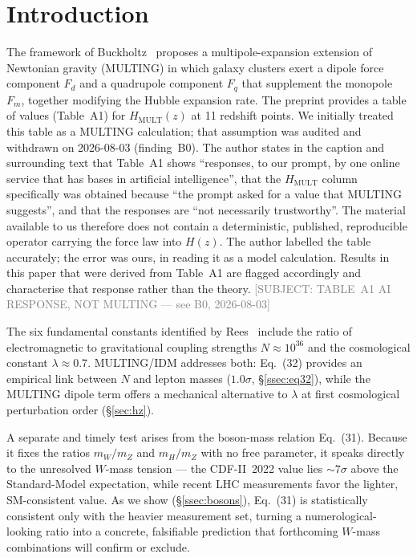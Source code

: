 \documentclass[twocolumn,prd,amsmath,amssymb,floatfix]{revtex4-2}
\newcommand{\tableAsubject}{\textcolor{gray}{\small[SUBJECT:
  TABLE~A1 AI RESPONSE, NOT MULTING --- see B0, 2026-08-03]}}
\begin{document}
\maketitle

\section{Introduction}
\label{sec:intro}

The framework of Buckholtz~\cite{buckholtz2026} proposes a multipole-expansion
extension of Newtonian gravity (MULTING) in which galaxy clusters exert a
dipole force component $F_d$ and a quadrupole component $F_q$ that supplement
the monopole $F_m$, together modifying the Hubble expansion rate.
The preprint provides a table of values (Table~A1) for
$H_\mathrm{MULT}(z)$ at 11 redshift points.
We initially treated this table as a MULTING calculation; that assumption
was audited and withdrawn on 2026-08-03 (finding~B0).
The author states in the caption and surrounding text that Table~A1 shows
``responses, to our prompt, by one online service that has bases in
artificial intelligence'', that the $H_\mathrm{MULT}$ column specifically
was obtained because ``the prompt asked for a value that MULTING
suggests'', and that the responses are ``not necessarily trustworthy''.
The material available to us therefore does not contain a deterministic,
published, reproducible operator carrying the force law into $H(z)$.
The author labelled the table accurately; the error was ours, in reading
it as a model calculation.
Results in this paper that were derived from Table~A1 are flagged
accordingly and characterise that response rather than the theory.
\tableAsubject

The six fundamental constants identified by Rees~\cite{rees1999} include
the ratio of electromagnetic to gravitational coupling strengths
$N \approx 10^{36}$ and the cosmological constant $\lambda \approx 0.7$.
MULTING/IDM addresses both: Eq.~(32) provides an empirical link between
$N$ and lepton masses ($1.0\sigma$, \S\ref{ssec:eq32}), while the MULTING
dipole term offers a mechanical alternative to $\lambda$ at first
cosmological perturbation order (\S\ref{sec:hz}).

A separate and timely test arises from the boson-mass relation Eq.~(31). Because
it fixes the ratios $m_W/m_Z$ and $m_H/m_Z$ with no free parameter, it speaks
directly to the unresolved $W$-mass tension --- the CDF-II~2022 value lies
$\sim 7\sigma$ above the Standard-Model expectation, while recent LHC
measurements favor the lighter, SM-consistent value. As we show
(\S\ref{ssec:bosons}), Eq.~(31) is statistically consistent only with the
heavier measurement set, turning a numerological-looking ratio into a concrete,
falsifiable prediction that forthcoming $W$-mass combinations will confirm or
exclude.
\end{document}
